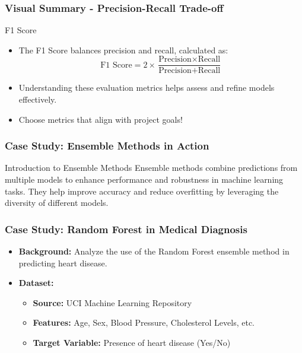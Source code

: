 \documentclass[aspectratio=169]{beamer}
\begin{document}
\begin{frame}[fragile]
    \frametitle{Visual Summary - Precision-Recall Trade-off}
    \begin{block}{F1 Score}
        \begin{itemize}
            \item The F1 Score balances precision and recall, calculated as:
            \begin{equation}
            \text{F1 Score} = 2 \times \frac{\text{Precision} \times \text{Recall}}{\text{Precision} + \text{Recall}}
            \end{equation}
        \end{itemize}
    \end{block}
    \begin{itemize}
        \item Understanding these evaluation metrics helps assess and refine models effectively.
        \item Choose metrics that align with project goals!
    \end{itemize}
\end{frame}

\begin{frame}[fragile]
    \frametitle{Case Study: Ensemble Methods in Action}
    \begin{block}{Introduction to Ensemble Methods}
        Ensemble methods combine predictions from multiple models to enhance performance and robustness in machine learning tasks.
        They help improve accuracy and reduce overfitting by leveraging the diversity of different models.
    \end{block}
\end{frame}

\begin{frame}[fragile]
    \frametitle{Case Study: Random Forest in Medical Diagnosis}
    \begin{itemize}
        \item \textbf{Background:} Analyze the use of the Random Forest ensemble method in predicting heart disease.
        \item \textbf{Dataset:}
            \begin{itemize}
                \item \textbf{Source:} UCI Machine Learning Repository
                \item \textbf{Features:} Age, Sex, Blood Pressure, Cholesterol Levels, etc.
                \item \textbf{Target Variable:} Presence of heart disease (Yes/No)
            \end{itemize}
    \end{itemize}
\end{frame}
\end{document}
